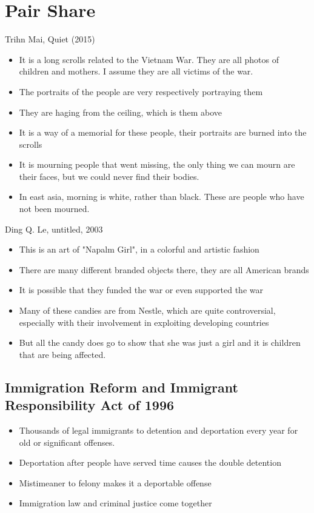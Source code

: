 \documentclass{article}
\begin{document}
\section*{Pair Share}

Trihn Mai, Quiet (2015)

\begin{itemize}
  \item It is a long scrolls related to the Vietnam War. They are all
    photos of children and mothers. I assume they are all victims of the war.
  \item The portraits of the people are very respectively portraying them
  \item They are haging from the ceiling, which is them above
  \item It is a way of a memorial for these people, their portraits are
    burned into the scrolls
  \item It is mourning people that went missing, the only thing we can mourn
    are their faces, but we could never find their bodies.
  \item In east asia, morning is white, rather than black. These are people
    who have not been mourned.
\end{itemize}

Ding Q. Le, untitled, 2003

\begin{itemize}
  \item This is an art of "Napalm Girl", in a colorful and artistic fashion
  \item There are many different branded objects there, they are all American brands
  \item It is possible that they funded the war or even supported the war
  \item Many of these candies are from Nestle, which are quite controversial,
    especially with their involvement in exploiting developing countries
  \item But all the candy does go to show that she was just a girl and it is children
    that are being affected.
\end{itemize}

\subsection{Immigration Reform and Immigrant Responsibility Act of 1996}
\begin{itemize}
  \item Thousands of legal immigrants to detention and deportation every year for old
    or significant offenses.
  \item Deportation after people have served time causes the double detention
  \item Mistimeaner to felony makes it a deportable offense
  \item Immigration law and criminal justice come together
\end{itemize}
\end{document}
